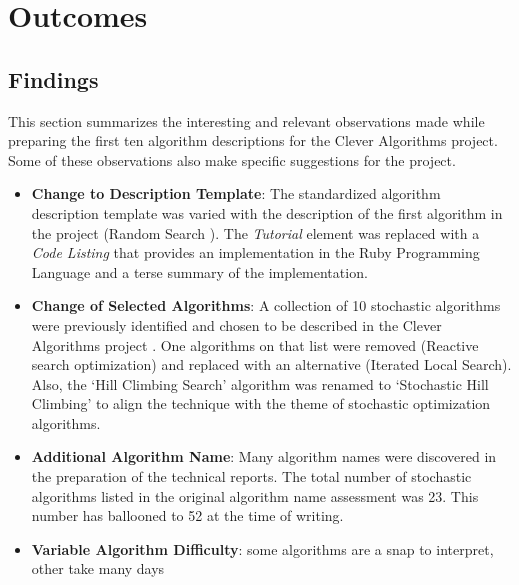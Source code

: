 \documentclass[a4paper, 11pt]{article}
\begin{document}
% 
% 
\section{Outcomes}
\label{sec:outcomes}

% 
% 
\subsection{Findings}
This section summarizes the interesting and relevant observations made while preparing the first ten algorithm descriptions for the Clever Algorithms project. Some of these observations also make specific suggestions for the project. 

\begin{itemize}
	\item \textbf{Change to Description Template}: The standardized algorithm description template \cite{Brownlee2010a} was varied with the description of the first algorithm in the project (Random Search \cite{Brownlee2010g}). The \emph{Tutorial} element was replaced with a \emph{Code Listing} that provides an implementation in the Ruby Programming Language and a terse summary of the implementation. 
	\item \textbf{Change of Selected Algorithms}: A  collection of 10 stochastic algorithms were previously identified and chosen to be described in the Clever Algorithms project \cite{Brownlee2010b}. One algorithms on that list were removed (Reactive search optimization) and replaced with an alternative (Iterated Local Search). Also, the `Hill Climbing Search' algorithm was renamed to `Stochastic Hill Climbing' to align the technique with the theme of stochastic optimization algorithms.
	\item \textbf{Additional Algorithm Name}: Many algorithm names were discovered in the preparation of the technical reports. The total number of stochastic algorithms listed in the original algorithm name assessment was 23. This number has ballooned to 52 at the time of writing.

		
	\item \textbf{Variable Algorithm Difficulty}: some algorithms are a snap to interpret, other take many days



\end{itemize}
\end{document}
